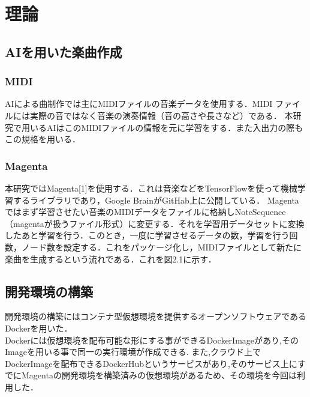 \chapter{理論}
\section{AIを用いた楽曲作成}
\subsection{MIDI}
AIによる曲制作では主にMIDIファイルの音楽データを使用する．MIDI ファイルには実際の音ではなく音楽の演奏情報（音の高さや長さなど）である．
本研究で用いるAIはこのMIDIファイルの情報を元に学習をする．また入出力の際もこの規格を用いる．
\subsection{Magenta}
本研究ではMagenta[1]を使用する．これは音楽などをTensorFlowを使って機械学習するライブラリであり，Google BrainがGitHab上に公開している．
Magentaではまず学習させたい音楽のMIDIデータをファイルに格納しNoteSequence（magentaが扱うファイル形式）に変更する．それを学習用データセットに変換したあと学習を行う．このとき，一度に学習させるデータの数，学習を行う回数，ノード数を設定する．これをパッケージ化し，MIDIファイルとして新たに楽曲を生成するという流れである．これを図2.1に示す．
\section{開発環境の構築}
開発環境の構築にはコンテナ型仮想環境を提供するオープンソフトウェアであるDockerを用いた．\\
Dockerには仮想環境を配布可能な形にする事ができるDockerImageがあり,そのImageを用いる事で同一の実行環境が作成できる.
また,クラウド上でDockerImageを配布できるDockerHubというサービスがあり,そのサービス上にすでにMagentaの開発環境を構築済みの仮想環境があるため、その環境を今回は利用した．


